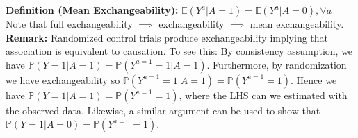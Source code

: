 \documentclass[10pt]{article}
\newcommand{\E}{\mathbb{E}}
\newcommand{\pp}{\mathbb{P}}
\begin{document}
\noindent \textbf{Definition (Mean Exchangeability):} $\E (Y^a | A = 1) = \E(Y^a | A = 0), \forall a$\\

Note that full exchangeability $\implies$ exchangeability $\implies$ mean exchangeability. \\

\noindent \textbf{Remark:} Randomized control trials produce exchangeability implying that association is equivalent to causation. To see this: By consistency assumption, we have $\pp (Y = 1 | A = 1) = \pp(Y^{a=1} = 1 | A = 1)$. Furthermore, by randomization we have exchangeability so $\pp(Y^{a=1} = 1 | A = 1) = \pp(Y^{a=1} = 1)$. Hence we have $\pp (Y = 1 | A = 1) = \pp(Y^{a=1} = 1)$, where the LHS can we estimated with the observed data. Likewise, a similar argument can be used to show that $\pp (Y = 1 | A = 0) = \pp(Y^{a=0} = 1)$.
\end{document}

